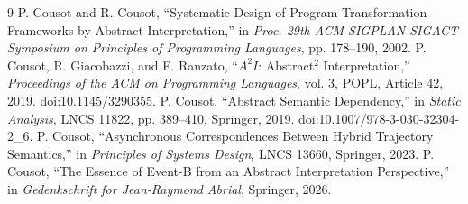 \documentclass[11pt]{article}
\begin{document}
\begin{thebibliography}{9}
 P. Cousot and R. Cousot, ``Systematic Design of Program Transformation Frameworks by Abstract Interpretation,'' in \emph{Proc. 29th ACM SIGPLAN-SIGACT Symposium on Principles of Programming Languages}, pp. 178--190, 2002.
 P. Cousot, R. Giacobazzi, and F. Ranzato, ``$A^2I$: Abstract$^2$ Interpretation,'' \emph{Proceedings of the ACM on Programming Languages}, vol. 3, POPL, Article 42, 2019. doi:10.1145/3290355.
 P. Cousot, ``Abstract Semantic Dependency,'' in \emph{Static Analysis}, LNCS 11822, pp. 389--410, Springer, 2019. doi:10.1007/978-3-030-32304-2\_6.
 P. Cousot, ``Asynchronous Correspondences Between Hybrid Trajectory Semantics,'' in \emph{Principles of Systems Design}, LNCS 13660, Springer, 2023.
 P. Cousot, ``The Essence of Event-B from an Abstract Interpretation Perspective,'' in \emph{Gedenkschrift for Jean-Raymond Abrial}, Springer, 2026.
\end{thebibliography}
\end{document}

